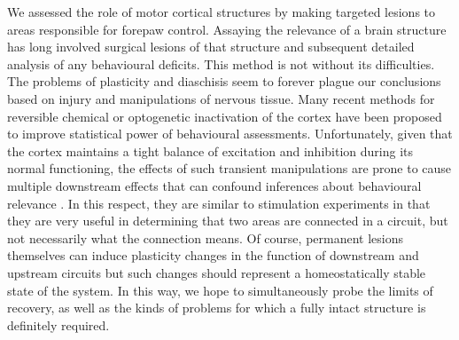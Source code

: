 We assessed the role of motor cortical structures by making targeted lesions to areas responsible for forepaw control. Assaying the relevance of a brain structure has long involved surgical lesions of that structure and subsequent detailed analysis of any behavioural deficits. This method is not without its difficulties. The problems of plasticity and diaschisis seem to forever plague our conclusions based on injury and manipulations of nervous tissue. Many recent methods for reversible chemical or optogenetic inactivation of the cortex have been proposed to improve statistical power of behavioural assessments. Unfortunately, given that the cortex maintains a tight balance of excitation and inhibition during its normal functioning, the effects of such transient manipulations are prone to cause multiple downstream effects that can confound inferences about behavioural relevance \cite{Otchy2015}. In this respect, they are similar to stimulation experiments in that they are very useful in determining that two areas are connected in a circuit, but not necessarily what the connection means. Of course, permanent lesions themselves can induce plasticity changes in the function of downstream and upstream circuits but such changes should represent a homeostatically stable state of the system. In this way, we hope to simultaneously probe the limits of recovery, as well as the kinds of problems for which a fully intact structure is definitely required.
